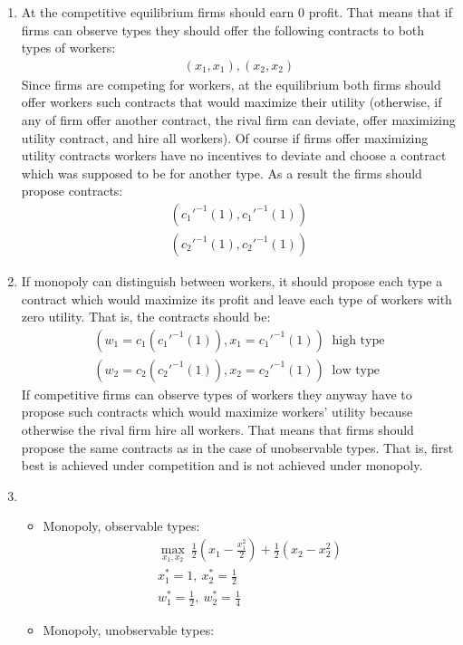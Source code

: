 \documentclass[a4paper]{article}
\begin{document}
\begin{enumerate}
	\item At the competitive equilibrium firms should earn 0 profit. That means that if firms can observe types they should offer the following contracts to both types of workers:
	\begin{align*}
	(x_1, x_1), (x_2, x_2)
	\end{align*}
	Since firms are competing for workers, at the equilibrium both firms should offer workers such contracts that would maximize their utility (otherwise, if any of firm offer another contract, the rival firm can deviate, offer maximizing utility contract, and hire all workers). Of course if firms offer maximizing utility contracts workers have no incentives to deviate and choose a contract which was supposed to be for another type. As a result the firms should propose contracts:
	\begin{align*}
	(c_1'^{-1}(1), c_1'^{-1}(1))\\
	(c_2'^{-1}(1), c_2'^{-1}(1))
	\end{align*}
	\item If monopoly can distinguish between workers, it should propose each type a contract which would maximize its profit and leave each type of workers with zero utility. That is, the contracts should be:
	\begin{align*}
	(w_1 = c_1(c_1'^{-1}(1)), x_1 = c_1'^{-1}(1))\ \text{ high type}\\
	(w_2 = c_2(c_2'^{-1}(1)), x_2 = c_2'^{-1}(1))\ \text{ low type}
	\end{align*}
	If competitive firms can observe types of workers they anyway have to propose such contracts which would maximize workers' utility because otherwise the rival firm hire all workers. That means that firms should propose the same contracts as in the case of unobservable types. That is, first best is achieved under competition and is not achieved under monopoly.
	\item \begin{itemize}
		\item Monopoly, observable types:
		\begin{align*}
		\underset{x_1, x_2}{\max}\ \frac{1}{2}\left(x_1 -\frac{x_1^2}{2}\right) + \frac{1}{2} \left(x_2 - x_2^2\right)\\
		x_1^* = 1,\ x_2^* = \frac{1}{2}\\
		w_1^* = \frac{1}{2},\ w_2^* = \frac{1}{4}
		\end{align*}
		\item Monopoly, unobservable types:
		\begin{align*}

\end{align*}
\end{itemize}
\end{enumerate}
\end{document}
